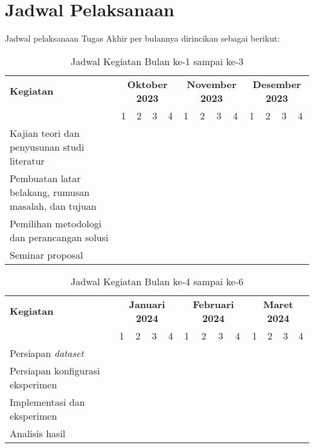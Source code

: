 \section{Jadwal Pelaksanaan}
Jadwal pelaksanaan Tugas Akhir per bulannya dirincikan sebagai berikut:

\begin{table}[ht]
\caption{Jadwal Kegiatan Bulan ke-1 sampai ke-3}
\begin{tabular}{|m{4cm}|*{12}{m{0.4cm}|}}
\hline
\rowcolor{lightgray} %
\textbf{Kegiatan} & \multicolumn{4}{c|}{\textbf{Oktober 2023}} & \multicolumn{4}{c|}{\textbf{November 2023}} & \multicolumn{4}{c|}{\textbf{Desember 2023}} \\
\cline{2-13}
\cellcolor{lightgray} & 1 & 2 & 3 & 4 & 1 & 2 & 3 & 4 & 1 & 2 & 3 & 4 \\
\hline
Kajian teori dan penyusunan studi literatur & \cellcolor{blue!25} & \cellcolor{blue!25} & \cellcolor{blue!25} & & & & & & & & & \\
\hline
Pembuatan latar belakang, rumusan masalah, dan tujuan & & & & \cellcolor{blue!25} & \cellcolor{blue!25} & \cellcolor{blue!25} & \cellcolor{blue!25} & & & & & \\
\hline
Pemilihan metodologi dan perancangan solusi & & & & & & & & \cellcolor{blue!25} & \cellcolor{blue!25} & \cellcolor{blue!25} & & \\
\hline
Seminar proposal & & & & & & & & & & & \cellcolor{blue!25} & \cellcolor{blue!25} \\
\hline
\end{tabular}
\end{table}

\begin{table}[ht]
\caption{Jadwal Kegiatan Bulan ke-4 sampai ke-6}
\begin{tabular}{|m{4.5cm}|*{12}{m{0.4cm}|}}
\hline
\rowcolor{lightgray} %
\textbf{Kegiatan} & \multicolumn{4}{c|}{\textbf{Januari 2024}} & \multicolumn{4}{c|}{\textbf{Februari 2024}} & \multicolumn{4}{c|}{\textbf{Maret 2024}} \\
\cline{2-13}
\cellcolor{lightgray} & 1 & 2 & 3 & 4 & 1 & 2 & 3 & 4 & 1 & 2 & 3 & 4 \\
\hline
Persiapan \textit{dataset} & \cellcolor{blue!25} & \cellcolor{blue!25} & & & & & & & & & & \\
\hline
Persiapan konfigurasi eksperimen & & & \cellcolor{blue!25} & \cellcolor{blue!25} & & & & & & & & \\
\hline
Implementasi dan eksperimen & & & & & \cellcolor{blue!25} &\cellcolor{blue!25}  & \cellcolor{blue!25}& \cellcolor{blue!25} & \cellcolor{blue!25} & & & \\
\hline
Analisis hasil & & & & & & & & & & \cellcolor{blue!25} & \cellcolor{blue!25} & \cellcolor{blue!25} \\
\hline
\end{tabular}
\end{table}

